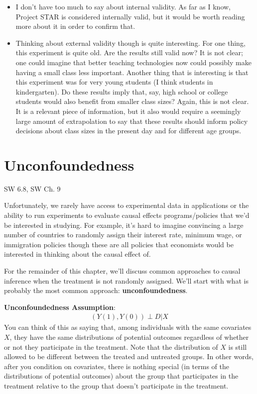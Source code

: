 \documentclass[
  letterpaper,
  DIV=11,
  numbers=noendperiod]{scrreprt}
\begin{document}
\begin{itemize}
\item
  I don't have too much to say about internal validity. As far as I
  know, Project STAR is considered internally valid, but it would be
  worth reading more about it in order to confirm that.
\item
  Thinking about external validity though is quite interesting. For one
  thing, this experiment is quite old. Are the results still valid now?
  It is not clear; one could imagine that better teaching technologies
  now could possibly make having a small class less important. Another
  thing that is interesting is that this experiment was for very young
  students (I think students in kindergarten). Do these results imply
  that, say, high school or college students would also benefit from
  smaller class sizes? Again, this is not clear. It is a relevant piece
  of information, but it also would require a seemingly large amount of
  extrapolation to say that these results should inform policy decisions
  about class sizes in the present day and for different age groups.
\end{itemize}

\section{Unconfoundedness}\label{unconfoundedness}

SW 6.8, SW Ch. 9

Unfortunately, we rarely have access to experimental data in
applications or the ability to run experiments to evaluate causal
effects programs/policies that we'd be interested in studying. For
example, it's hard to imagine convincing a large number of countries to
randomly assign their interest rate, minimum wage, or immigration
policies though these are all policies that economists would be
interested in thinking about the causal effect of.

For the remainder of this chapter, we'll discuss common approaches to
causal inference when the treatment is not randomly assigned. We'll
start with what is probably the most common approach:
\textbf{unconfoundedness}.

\textbf{Unconfoundedness Assumption}: \begin{align*}
  (Y(1),Y(0)) \perp D | X
\end{align*} You can think of this as saying that, among individuals
with the same covariates \(X\), they have the same distributions of
potential outcomes regardless of whether or not they participate in the
treatment. Note that the distribution of \(X\) is still allowed to be
different between the treated and untreated groups. In other words,
after you condition on covariates, there is nothing special (in terms of
the distributions of potential outcomes) about the group that
participates in the treatment relative to the group that doesn't
participate in the treatment.
\end{document}
